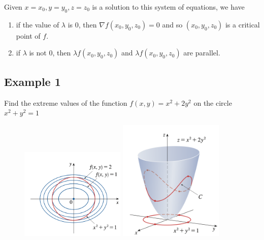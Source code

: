 \begin{flushleft}
    Given $x=x_0, y=y_0, z=z_0$ is a solution to this system of equations, we have
    
    \begin{enumerate}
        \item if the value of $\lambda$ is 0, then $\nabla f(x_0, y_0, z_0)=0$ and so  $(x_0, y_0, z_0)$ is a critical point of $f$.
        \item if $\lambda$ is not 0, then $\lambda f(x_0, y_0, z_0)$ and $\lambda f(x_0, y_0, z_0)$ are parallel.
        \end{enumerate}
\end{flushleft}

\subsection{Example 1}

Find the extreme values of the function $ f(x, y)=x^2 + 2y^2 $ on the circle $ x^2 + y^2=1 $

\begin{figure}
    \centering
    \subfloat
        \centering
        \includegraphics[width=5cm]{chapter003/figures/fig002}
    \qquad
    \subfloat
        \centering
            \includegraphics[width=5cm]{chapter003/figures/fig001}
    \label{fig:example}
\end{figure}

